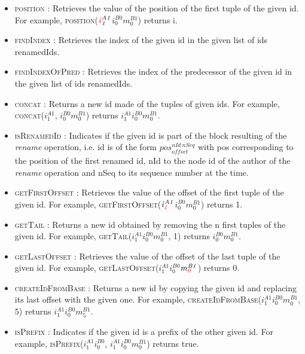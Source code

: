 \documentclass[10pt,journal,compsoc]{IEEEtran}
\newcommand{\ie}{i.e. }
\newcommand{\trm}[1]{\mathit{#1}}
\newcommand{\id}[3]{$\trm{#1}^{\trm{#2}}_{\trm{#3}}$}
\begin{document}
\begin{itemize}
    \item \textsc{position} : Retrieves the value of the position of the first tuple of the given id.
        For example, \textsc{position}(\id{\color{red}i}{A1}{1}\id{i}{B0}{0}\id{m}{B1}{0}) returns {\color{red}i}.
    \item \textsc{findIndex} : Retrieves the index of the given id in the given list of ids renamedIds.
    \item \textsc{findIndexOfPred} : Retrieves the index of the predecessor of the given id in the given list of ids renamedIds.
    \item \textsc{concat} : Returns a new id made of the tuples of given ids.
        For example, \textsc{concat}(\id{i}{A1}{1}, \id{i}{B0}{0}\id{m}{B1}{0}) returns \id{i}{A1}{1}\id{i}{B0}{0}\id{m}{B1}{0}.
    \item \textsc{isRenamedId} : Indicates if the given id is part of the block resulting of the \emph{rename} operation, \ie id is of the form \id{pos}{nId~nSeq}{offset} with pos corresponding to the position of the first renamed id, nId to the node id of the author of the \emph{rename} operation and nSeq to its sequence number at the time.
    \item \textsc{getFirstOffset} : Retrieves the value of the offset of the first tuple of the given id.
        For example, \textsc{getFirstOffset}(\id{i}{A1}{\color{red}1}\id{i}{B0}{0}\id{m}{B1}{0}) returns {\color{red}1}.
    \item \textsc{getTail} : Returns a new id obtained by removing the n first tuples of the given id.
        For example, \textsc{getTail}(\id{i}{A1}{1}\id{i}{B0}{0}\id{m}{B1}{0}, 1) returns \id{i}{B0}{0}\id{m}{B1}{0}.
    \item \textsc{getLastOffset} : Retrieves the value of the offset of the last tuple of the given id.
        For example, \textsc{getLastOffset}(\id{i}{A1}{1}\id{i}{B0}{0}\id{m}{B1}{\color{red}0}) returns {\color{red}0}.
    \item \textsc{createIdFromBase} : Returns a new id by copying the given id and replacing its last offset with the given one.
        For example, \textsc{createIdFromBase}(\id{i}{A1}{1}\id{i}{B0}{0}\id{m}{B1}{0}, 5) returns \id{i}{A1}{1}\id{i}{B0}{0}\id{m}{B1}{5}.
    \item \textsc{isPrefix} : Indicates if the given id is a prefix of the other given id.
        For example, \textsc{isPrefix}(\id{i}{A1}{1}\id{i}{B0}{0}, \id{i}{A1}{1}\id{i}{B0}{0}\id{m}{B1}{0}) returns true.
\end{itemize}
\end{document}
